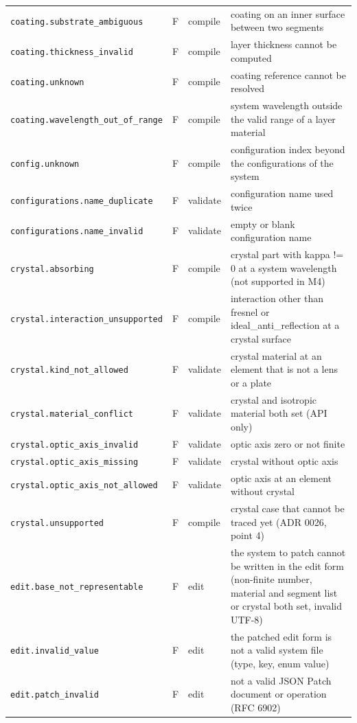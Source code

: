 \documentclass[11pt,a4paper,openany]{book}
\begin{document}
{\begin{longtable}{@{}L{6.1cm}cL{1.3cm}L{6.9cm}@{}}
\texttt{coating.substrate\_ambiguous} & F & compile & coating on an inner surface between two segments \\
\texttt{coating.thickness\_invalid} & F & compile & layer thickness cannot be computed \\
\texttt{coating.unknown} & F & compile & coating reference cannot be resolved \\
\texttt{coating.wavelength\_out\_of\_range} & F & compile & system wavelength outside the valid range of a layer material \\
\texttt{config.unknown} & F & compile & configuration index beyond the configurations of the system \\
\texttt{configurations.name\_duplicate} & F & validate & configuration name used twice \\
\texttt{configurations.name\_invalid} & F & validate & empty or blank configuration name \\
\texttt{crystal.absorbing} & F & compile & crystal part with kappa != 0 at a system wavelength (not supported in M4) \\
\texttt{crystal.interaction\_unsupported} & F & compile & interaction other than fresnel or ideal\_anti\_reflection at a crystal surface \\
\texttt{crystal.kind\_not\_allowed} & F & validate & crystal material at an element that is not a lens or a plate \\
\texttt{crystal.material\_conflict} & F & validate & crystal and isotropic material both set (API only) \\
\texttt{crystal.optic\_axis\_invalid} & F & validate & optic axis zero or not finite \\
\texttt{crystal.optic\_axis\_missing} & F & validate & crystal without optic axis \\
\texttt{crystal.optic\_axis\_not\_allowed} & F & validate & optic axis at an element without crystal \\
\texttt{crystal.unsupported} & F & compile & crystal case that cannot be traced yet (ADR 0026, point 4) \\
\texttt{edit.base\_not\_representable} & F & edit & the system to patch cannot be written in the edit form (non-finite number, material and segment list or crystal both set, invalid UTF-8) \\
\texttt{edit.invalid\_value} & F & edit & the patched edit form is not a valid system file (type, key, enum value) \\
\texttt{edit.patch\_invalid} & F & edit & not a valid JSON Patch document or operation (RFC 6902) \\

\end{longtable}}
\end{document}
